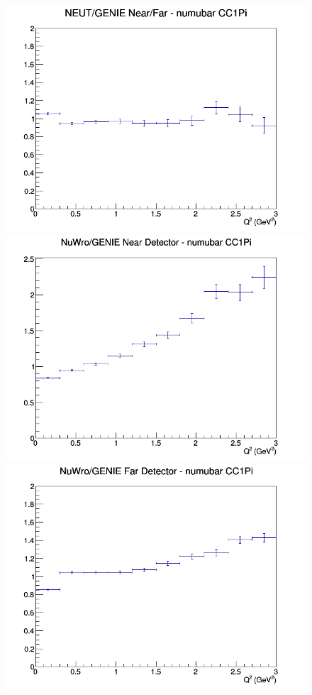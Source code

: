 \begin{figure}[h]
\endminipage
{}
\includegraphics[width=\linewidth]{eff_Q2/FGT/ratios/CC1Pi_NEUT_GENIE_numubar_NF_Q2.png}
\endminipage
\newline
{}
\includegraphics[width=\linewidth]{eff_Q2/FGT/ratios/CC1Pi_NuWro_GENIE_numubar_near_Q2.png}
\endminipage
{}
\includegraphics[width=\linewidth]{eff_Q2/FGT/ratios/CC1Pi_NuWro_GENIE_numubar_far_Q2.png}

\end{figure}
